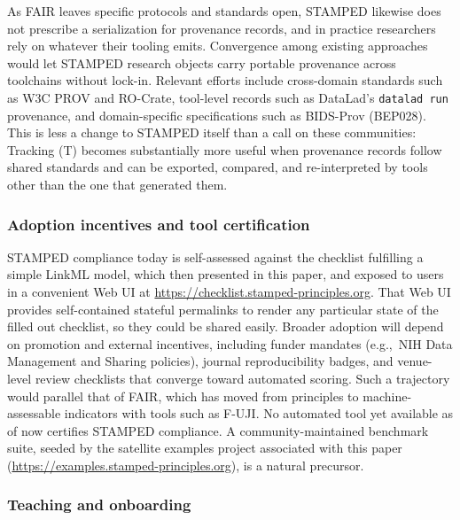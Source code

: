 \documentclass{article}
\makeatletter
\newcommand{\hyanchor}[1]{\texorpdfstring{\Hy@raisedlink{\hypertarget{#1}{}}}{}}
\newcommand{\anchoredsubsubsection}[2]{\subsubsection[#2]{\hyanchor{#1}#2}}
\makeatother
\begin{document}
As FAIR leaves specific protocols and standards open, STAMPED likewise does not prescribe a serialization for provenance records, and in practice researchers rely on whatever their tooling emits.
Convergence among existing approaches would let STAMPED research objects carry portable provenance across toolchains without lock-in.
Relevant efforts include cross-domain standards such as W3C PROV\cite{w3c_provenance_working_group_prov-overview_2013} and RO-Crate\cite{peroni_packaging_2022}, tool-level records such as DataLad's\cite{halchenko_datalad_2021} \texttt{datalad run} provenance, and domain-specific specifications such as BIDS-Prov (BEP028)\cite{bids_community_bep028_2025}.
This is less a change to STAMPED itself than a call on these communities: Tracking (T) becomes substantially more useful when provenance records follow shared standards and can be exported, compared, and re-interpreted by tools other than the one that generated them.


\anchoredsubsubsection{adoption-incentives}{Adoption incentives and tool certification}

STAMPED compliance today is self-assessed against the checklist fulfilling a simple LinkML model\cite{stamped-checklist-schema:v0.1.0}, which then presented in this paper, and exposed to users in a convenient Web UI at \url{https://checklist.stamped-principles.org}.
That Web UI provides self-contained stateful permalinks to render any particular state of the filled out checklist, so they could be shared easily.
Broader adoption will depend on promotion and external incentives, including funder mandates (e.g.,\ NIH Data Management and Sharing policies), journal reproducibility badges\cite{center_for_open_science_open_2023}, and venue-level review checklists that converge toward automated scoring. 
Such a trajectory would parallel that of FAIR, which has moved from principles to machine-assessable indicators with tools such as F-UJI\cite{devaraju_automated_2021}.
No automated tool yet available as of now certifies STAMPED compliance.
A community-maintained benchmark suite, seeded by the satellite examples project associated with this paper (\url{https://examples.stamped-principles.org}), is a natural precursor.


\anchoredsubsubsection{teaching}{Teaching and onboarding}
\end{document}
